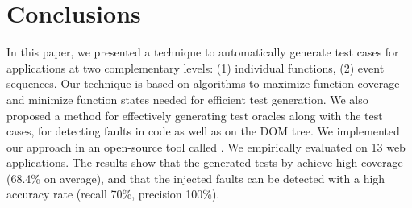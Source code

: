 \section{Conclusions} \label{Sec:concs}

In this paper, we presented a technique  to automatically generate  test cases for \javascript applications at two complementary levels: (1) individual \javascript functions, (2) event sequences. 
Our technique is based on algorithms to maximize function coverage and minimize function states needed for efficient test generation.
We also proposed a method for effectively generating test oracles along with the test cases, for detecting faults in \javascript code as well as on the DOM tree. We implemented our  approach in an open-source tool called \tool. We empirically evaluated \tool on 13 web applications. The results show that the generated tests by \tool achieve high coverage (68.4\% on average),  and that the injected faults can be detected with a high accuracy rate (recall 70\%, precision 100\%). 
%
 